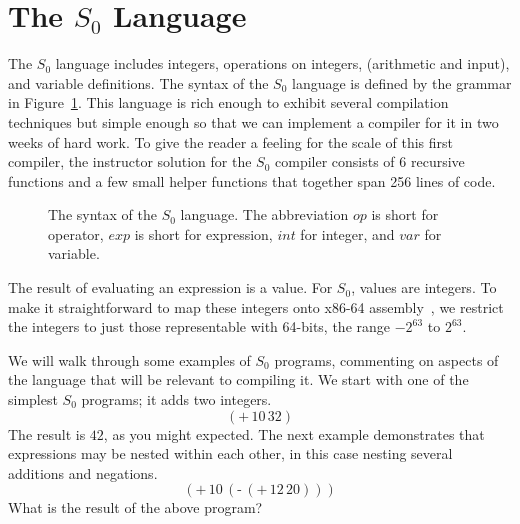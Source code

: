 \documentclass[12pt]{book}
\makeatletter
\newenvironment{chapquote}[2][2em]
  {\setlength{\@tempdima}{#1}%
   \def\chapquote@author{#2}%
   \parshape 1 \@tempdima \dimexpr\textwidth-2\@tempdima\relax%
   \itshape}
  {\par\normalfont\hfill--\ \chapquote@author\hspace*{\@tempdima}\par\bigskip}
\newcommand{\itm}[1]{\ensuremath{\mathit{#1}}}
\newcommand{\Exp}{\itm{exp}}
\newcommand{\Int}{\itm{int}}
\newcommand{\Var}{\itm{var}}
\newcommand{\Op}{\itm{op}}
\newcommand{\key}[1]{\texttt{#1}}
\newcommand{\UNIOP}[2]{(\key{#1}\,#2)}
\newcommand{\BINOP}[3]{(\key{#1}\,#2\,#3)}
\newcommand{\LET}[3]{(\key{let}\,([#1\;#2])\,#3)}
\makeatother
\begin{document}

\section{The $S_0$ Language}

The $S_0$ language includes integers, operations on integers,
(arithmetic and input), and variable definitions.  The syntax of the
$S_0$ language is defined by the grammar in
Figure~\ref{fig:s0-syntax}. This language is rich enough to exhibit
several compilation techniques but simple enough so that we can
implement a compiler for it in two weeks of hard work.  To give the
reader a feeling for the scale of this first compiler, the instructor
solution for the $S_0$ compiler consists of 6 recursive functions and
a few small helper functions that together span 256 lines of code.

\begin{figure}[htbp]
\centering
\fbox{
\begin{minipage}{0.85\textwidth}
\[
\begin{array}{lcl}
  \Op  &::=& \key{+} \mid \key{-} \mid \key{*} \mid \key{read} \\
  \Exp &::=& \Int \mid (\Op \; \Exp^{*}) \mid \Var \mid \LET{\Var}{\Exp}{\Exp}
\end{array}
\]
\end{minipage}
}
\caption{The syntax of the $S_0$ language. The abbreviation \Op{} is
  short for operator, \Exp{} is short for expression, \Int{} for integer,
  and \Var{} for variable.}
\label{fig:s0-syntax}
\end{figure}

The result of evaluating an expression is a value.  For $S_0$, values
are integers. To make it straightforward to map these integers onto
x86-64 assembly~\citep{Matz:2013aa}, we restrict the integers to just
those representable with 64-bits, the range $-2^{63}$ to $2^{63}$.

We will walk through some examples of $S_0$ programs, commenting on
aspects of the language that will be relevant to compiling it.  We
start with one of the simplest $S_0$ programs; it adds two integers.
\[
\BINOP{+}{10}{32}
\]
The result is $42$, as you might expected. 
%
The next example demonstrates that expressions may be nested within
each other, in this case nesting several additions and negations.
\[
\BINOP{+}{10}{ \UNIOP{-}{ \BINOP{+}{12}{20} } }
\]
What is the result of the above program?
\end{document}
